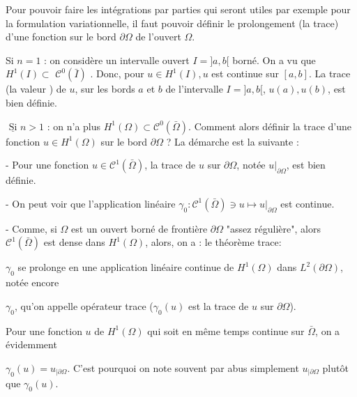 Pour pouvoir faire les intégrations par parties qui seront utiles par exemple pour la formulation variationnelle, il faut pouvoir définir le prolongement (la trace) d'une fonction sur le bord $\partial \Omega$ de l'ouvert $\Omega$.

Si $n=1$ : on considère un intervalle ouvert $I=] a, b[$ borné. On a vu que $H^{1}(I) \subset$ $\mathcal{C}^{0}(\bar{I})$ . Donc, pour  $u \in H^{1}(I), u$ est continue sur $[a, b]$. La  trace (la valeur )  de $u$,  sur les bords $a$ et $b$ de l'intervalle  $I=] a, b[$, $u(a), u(b)$,  est  bien définie.


$\underline{\text { Si }} n>1$ : on n'a plus $H^{1}(\Omega) \subset \mathcal{C}^{0}(\bar{\Omega})$. Comment alors définir la trace d'une fonction $u\in H^{1}(\Omega)$ sur le bord $\partial \Omega$ ?  La démarche est la suivante :

- Pour une fonction $u\in 
\mathcal{C}^{1}(\bar{\Omega})$,  la trace de $u$ sur $\partial \Omega$, notée $u|_{\partial \Omega}$,  est  bien définie. 

- On peut voir que l'application linéaire  $\gamma_0: \mathcal{C}^{1}(\bar{\Omega})\ni u \longmapsto u|_{\partial \Omega}$ est  continue. 

- Comme, si $\Omega$ est un ouvert borné de frontière $\partial \Omega$ "assez régulière", alors $\mathcal{C}^{1}(\bar{\Omega})$ est dense dans $H^{1}(\Omega)$, alors, on a : le théorème trace: 

$\gamma_0$  se prolonge en une application linéaire continue de $H^{1}(\Omega)$ dans $L^{2}(\partial \Omega)$, notée encore 

$\gamma_{0}$, qu'on appelle opérateur  trace ($\gamma_{0}(u)$ est la trace de $u$ sur $\partial \Omega$). 

Pour une fonction $u$ de $H^{1}(\Omega)$ qui soit en même temps continue sur $\bar{\Omega}$, on a évidemment 

$\gamma_{0}(u)=u_{\mid \partial \Omega} .$ C'est pourquoi on note souvent par abus simplement $u_{\mid \partial \Omega}$ plutôt que $\gamma_{0}(u)$.

%

